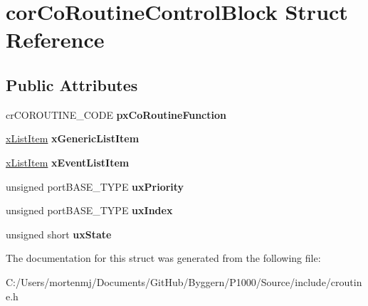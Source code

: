 \hypertarget{structcor_co_routine_control_block}{\section{cor\-Co\-Routine\-Control\-Block Struct Reference}
\label{structcor_co_routine_control_block}
}
\subsection*{Public Attributes}
\begin{DoxyCompactItemize}
\item 
\hypertarget{structcor_co_routine_control_block_acc98c7364cd88e8e034a5f9bba113832}{cr\-C\-O\-R\-O\-U\-T\-I\-N\-E\-\_\-\-C\-O\-D\-E {\bfseries px\-Co\-Routine\-Function}}\label{structcor_co_routine_control_block_acc98c7364cd88e8e034a5f9bba113832}

\item 
\hypertarget{structcor_co_routine_control_block_ad088a2410ffd125ce32562e2faa4861d}{\hyperlink{structx_l_i_s_t___i_t_e_m}{x\-List\-Item} {\bfseries x\-Generic\-List\-Item}}\label{structcor_co_routine_control_block_ad088a2410ffd125ce32562e2faa4861d}

\item 
\hypertarget{structcor_co_routine_control_block_ae3df50ba6714e9c2683cefa31dc0bc50}{\hyperlink{structx_l_i_s_t___i_t_e_m}{x\-List\-Item} {\bfseries x\-Event\-List\-Item}}\label{structcor_co_routine_control_block_ae3df50ba6714e9c2683cefa31dc0bc50}

\item 
\hypertarget{structcor_co_routine_control_block_af736666edff352eba690b3a5878bbdde}{unsigned port\-B\-A\-S\-E\-\_\-\-T\-Y\-P\-E {\bfseries ux\-Priority}}\label{structcor_co_routine_control_block_af736666edff352eba690b3a5878bbdde}

\item 
\hypertarget{structcor_co_routine_control_block_a9f4a873d7b5447f3677639080c8f5f51}{unsigned port\-B\-A\-S\-E\-\_\-\-T\-Y\-P\-E {\bfseries ux\-Index}}\label{structcor_co_routine_control_block_a9f4a873d7b5447f3677639080c8f5f51}

\item 
\hypertarget{structcor_co_routine_control_block_adb706fe642d1c39528402ec6393fcaa9}{unsigned short {\bfseries ux\-State}}\label{structcor_co_routine_control_block_adb706fe642d1c39528402ec6393fcaa9}

\end{DoxyCompactItemize}


The documentation for this struct was generated from the following file\-:\begin{DoxyCompactItemize}
\item 
C\-:/\-Users/mortenmj/\-Documents/\-Git\-Hub/\-Byggern/\-P1000/\-Source/include/croutine.\-h\end{DoxyCompactItemize}
